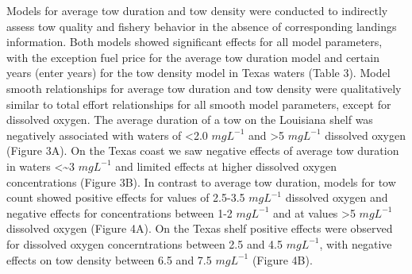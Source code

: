 \documentclass[10pt]{article}
\begin{document}
Models for average tow duration and tow density were conducted to indirectly assess tow quality and fishery behavior in the absence of corresponding landings information.  Both models showed significant effects for all  model parameters, with the exception fuel price for the average tow duration model and  certain years (enter years) for the tow density model in Texas waters (Table 3).  Model smooth relationships for average tow duration and tow density were qualitatively similar to total effort relationships for all smooth model parameters, except for dissolved oxygen.  The average duration of a tow on the Louisiana shelf was negatively associated with waters of \textless 2.0 $mg{} L^{-1}$ and \textgreater 5 $mg{} L^{-1}$ dissolved oxygen (Figure 3A).  On the Texas coast we saw negative effects of average tow duration in waters \textless \sim 3 $mg{} L^{-1}$ and limited effects at higher dissolved oxygen concentrations (Figure 3B).  In contrast to average tow duration, models for tow count showed positive effects for values of 2.5-3.5 $mg{} L^{-1}$ dissolved oxygen and negative effects for concentrations between 1-2 $mg{} L^{-1}$ and at values \textgreater 5 $mg{} L^{-1}$ dissolved oxygen (Figure 4A).  On the Texas shelf positive effects were observed for dissolved oxygen concerntrations between 2.5 and 4.5 $mg{} L^{-1}$, with negative effects on tow density between 6.5 and 7.5 $mg{} L^{-1}$ (Figure 4B).      
\end{document}
